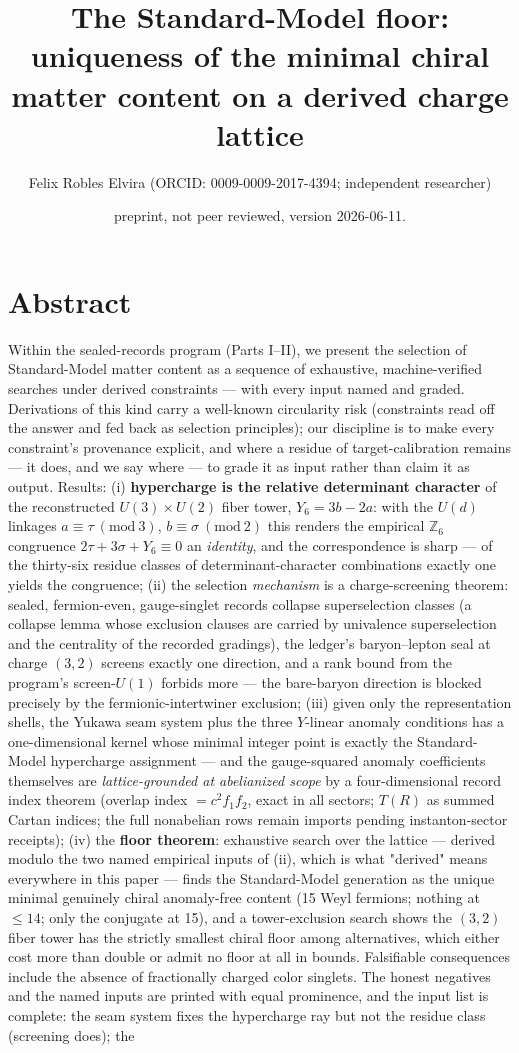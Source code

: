 \documentclass[11pt]{article}
\title{The Standard-Model floor: uniqueness of the minimal chiral matter content on a derived charge lattice}
\author{Felix Robles Elvira (ORCID: 0009-0009-2017-4394; independent researcher)}
\date{\small preprint, not peer reviewed, version 2026-06-11.}
\begin{document}
\maketitle

\section*{Abstract}
Within the sealed-records program (Parts I–II), we present the selection of Standard-Model matter content as a sequence of exhaustive, machine-verified searches under derived constraints — with every input named and graded.  Derivations of this kind carry a well-known circularity risk (constraints read off the answer and fed back as selection principles); our discipline is to make every constraint's provenance explicit, and where a residue of target-calibration remains — it does, and we say where — to grade it as input rather than claim it as output.  Results: (i) \textbf{hypercharge is the relative determinant character} of the reconstructed $U(3)\times U(2)$ fiber tower, $Y_6 = 3b - 2a$: with the $U(d)$ linkages $a \equiv \tau \ (\mathrm{mod}\ 3)$, $b \equiv \sigma\ (\mathrm{mod}\ 2)$ this renders the empirical $\mathbb Z_6$ congruence $2\tau + 3\sigma + Y_6 \equiv 0$ an \emph{identity}, and the correspondence is sharp — of the thirty-six residue classes of determinant-character combinations exactly one yields the congruence; (ii) the selection \emph{mechanism} is a charge-screening theorem: sealed, fermion-even, gauge-singlet records collapse superselection classes (a collapse lemma whose exclusion clauses are carried by univalence superselection and the centrality of the recorded gradings), the ledger's baryon–lepton seal at charge $(3,2)$ screens exactly one direction, and a rank bound from the program's screen-$U(1)$ forbids more — the bare-baryon direction is blocked precisely by the fermionic-intertwiner exclusion; (iii) given only the representation shells, the Yukawa seam system plus the three $Y$-linear anomaly conditions has a one-dimensional kernel whose minimal integer point is exactly the Standard-Model hypercharge assignment — and the gauge-squared anomaly coefficients themselves are \emph{lattice-grounded at abelianized scope} by a four-dimensional record index theorem (overlap index $= c^2 f_1 f_2$, exact in all sectors; $T(R)$ as summed Cartan indices; the full nonabelian rows remain imports pending instanton-sector receipts); (iv) the \textbf{floor theorem}: exhaustive search over the lattice — derived modulo the two named empirical inputs of (ii), which is what "derived" means everywhere in this paper — finds the Standard-Model generation as the unique minimal genuinely chiral anomaly-free content (15 Weyl fermions; nothing at $\le 14$; only the conjugate at 15), and a tower-exclusion search shows the $(3,2)$ fiber tower has the strictly smallest chiral floor among alternatives, which either cost more than double or admit no floor at all in bounds.  Falsifiable consequences include the absence of fractionally charged color singlets.  The honest negatives and the named inputs are printed with equal prominence, and the input list is complete: the seam system fixes the hypercharge ray but not the residue class (screening does); the 
\end{document}

